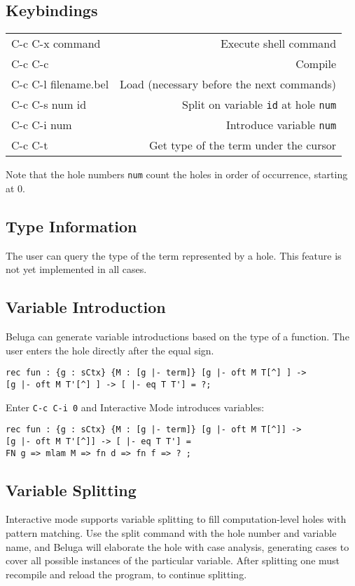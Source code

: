 \documentclass[11pt]{article}
\begin{document}
\subsection{Keybindings}

\begin{tabular}{ l r }
C-c C-x command & Execute shell command \\
C-c C-c & Compile \\
C-c C-l filename.bel & Load (necessary before the next commands) \\
C-c C-s num id & Split on variable \texttt{id} at hole \texttt{num} \\
C-c C-i num & Introduce variable \texttt{num} \\
C-c C-t & Get type of the term under the cursor \\
\end{tabular}

Note that the hole numbers \texttt{num} count the holes in order of occurrence, starting at 0.

\subsection{Type Information}
The user can query the type of the term represented by a hole. This feature is not yet implemented in all cases.

\subsection{Variable Introduction}
Beluga can generate variable introductions based on the type of a function. The user enters the hole directly after the equal sign. 
\begin{verbatim}
rec fun : {g : sCtx} {M : [g |- term]} [g |- oft M T[^] ] -> 
[g |- oft M T'[^] ] -> [ |- eq T T'] = ?;
\end{verbatim}

Enter \texttt{C-c C-i 0} and Interactive Mode introduces variables:
\begin{verbatim}
rec fun : {g : sCtx} {M : [g |- term]} [g |- oft M T[^]] -> 
[g |- oft M T'[^]] -> [ |- eq T T'] =
FN g => mlam M => fn d => fn f => ? ;
\end{verbatim}


\subsection{Variable Splitting}
Interactive mode supports variable splitting to fill computation-level
holes with pattern matching. Use the split command with the hole
number and variable name, and Beluga will elaborate the hole with case
analysis, generating cases to cover all possible instances of the
particular variable. After splitting one must recompile and reload the
program, to continue splitting.
\end{document}
